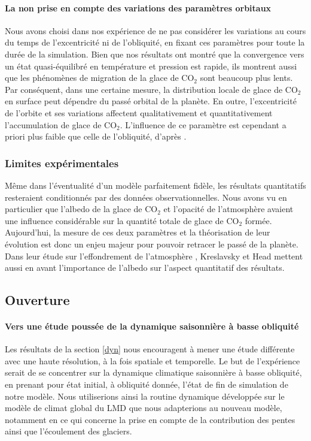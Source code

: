 \documentclass[11pt,a4paper]{article}
\begin{document}
\paragraph{La non prise en compte des variations des paramètres orbitaux \\}
Nous avons choisi dans nos expérience de ne pas considérer les variations au cours du temps de l'excentricité ni de l'obliquité, en fixant ces paramètres pour toute la durée de la simulation. Bien que nos résultats ont montré que la convergence vers un état quasi-équilibré en température et pression est rapide, ils montrent aussi que les phénomènes de migration de la glace de CO$_2$ sont beaucoup plus lents. Par conséquent, dans une certaine mesure, la distribution locale de glace de CO$_2$ en surface peut dépendre du passé orbital de la planète. En outre, l'excentricité de l'orbite et ses variations affectent qualitativement et quantitativement l'accumulation de glace de CO$_2$. L'influence de ce paramètre est cependant a priori plus faible que celle de l'obliquité, d'après \cite{Kres:05}. \\


\subsubsection{Limites expérimentales}
Même dans l'éventualité d'un modèle parfaitement fidèle, les résultats quantitatifs resteraient conditionnés par des données observationnelles. Nous avons vu en particulier que l'albedo de la glace de CO$_2$ et l'opacité de l'atmosphère avaient une influence considérable sur la quantité totale de glace de CO$_2$ formée. Aujourd'hui, la mesure de ces deux paramètres et la théorisation de leur évolution est donc un enjeu majeur pour pouvoir retracer le passé de la planète. Dans leur étude sur l'effondrement de l'atmosphère \citep{Kres:05}, Kreslavsky et Head mettent aussi en avant l'importance de l'albedo sur l'aspect quantitatif des résultats. \\

\subsection{Ouverture}
\paragraph{Vers une étude poussée de la dynamique saisonnière à basse obliquité \\}
Les résultats de la section \ref{dyn} nous encouragent à mener une étude différente avec une haute résolution, à la fois spatiale et temporelle. Le but de l'expérience serait de se concentrer sur la dynamique climatique saisonnière à basse obliquité, en prenant pour état initial, à obliquité donnée, l'état de fin de simulation de notre modèle. Nous utiliserions ainsi la routine dynamique développée sur le modèle de climat global du LMD que nous adapterions au nouveau modèle, notamment en ce qui concerne la prise en compte de la contribution des pentes ainsi que l'écoulement des glaciers. \\
\end{document}

